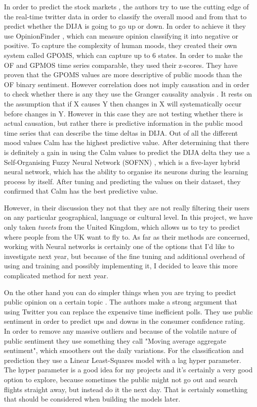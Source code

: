 \documentclass[minf,frontabs,twoside,singlespacing,parskip]{infthesis}
\begin{document}
In order to predict the stock markets \cite{twitstock}, the authors try to use the cutting edge of the real-time twitter data in order to classify the overall mood and from that to predict whether the DIJA \cite{dija} is going to go up or down. In order to achieve it they use OpinionFinder \cite{opfind}, which can measure opinion classifying it into negative or positive. To capture the complexity of human moods, they created their own system called GPOMS, which can capture up to 6 states. 
In order to make the OF and GPMOS time series comparable, they used their z-scores. They have proven that the GPOMS values are more descriptive of public moods than the OF binary sentiment. However correlation does not imply causation and in order to check whether there is any they use the Granger causality analysis \cite{granger}. It rests on the assumption that if X causes Y then changes in X will systematically occur before changes in Y. However in this case they are not testing whether there is actual causation, but rather there is predictive information in the public mood time series that can describe the time deltas in DIJA. Out of all the different mood values Calm has the highest predictive value. After determining that there is definitely a gain in using the Calm values to predict the DIJA delta they use a Self-Organising Fuzzy Neural Network (SOFNN) \cite{sofnn}, which is a five-layer hybrid neural network, which has the ability to organise its neurons during the learning process by itself. After tuning and predicting the values on their dataset, they confirmed that Calm has the best predictive value. 

However, in their discussion they not that they are not really filtering their users on any particular geographical, language or cultural level. In this project, we have only taken \emph{tweets} from the United Kingdom, which allows us to try to predict where people from the UK want to fly to. As far as their methods are concerned, working with Neural networks is certainly one of the options that I'd like to investigate next year, but because of the fine tuning and additional overhead of using and training and possibly implementing it, I decided to leave this more complicated method for next year. 


On the other hand you can do simpler things when you are trying to predict public opinion on a certain topic \cite{twitpoll}. The authors make a strong argument that using Twitter you can replace the expensive time inefficient polls. They use public sentiment in order to predict ups and downs in the consumer confidence rating. In order to remove any massive outliers and because of the volatile nature of public sentiment they use something they call "Moving average aggregate sentiment", which smoothers out the daily variations. For the classification and prediction they use a Linear Least-Squares model with a lag hyper parameter. The hyper parameter is a good idea for my projects and it's certainly a very good option to explore, because sometimes the public might not go out and search flights straight away, but instead do it the next day. That is certainly something that should be considered when building the models later.
\end{document}

